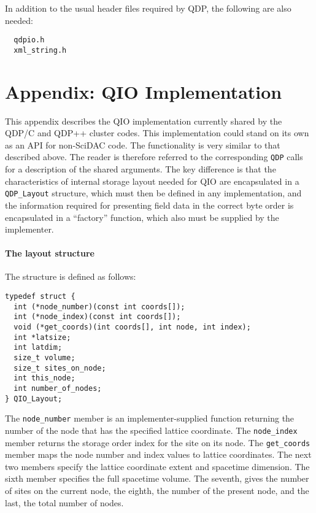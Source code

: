 \documentclass{article}
\begin{document}
In addition to the usual header files required by QDP, the following
are also needed:
%
\begin{verbatim}
  qdpio.h
  xml_string.h
\end{verbatim}
%

\section{Appendix: QIO Implementation}

This appendix describes the QIO implementation currently shared by the
QDP/C and QDP++ cluster codes.  This implementation could stand on its
own as an API for non-SciDAC code.  The functionality is very similar
to that described above.  The reader is therefore referred to the
corresponding \verb|QDP| calls for a description of the shared
arguments.  The key difference is that the characteristics of internal
storage layout needed for QIO are encapsulated in a \verb|QDP_Layout|
structure, which must then be defined in any implementation, and the
information required for presenting field data in the correct byte
order is encapsulated in a ``factory'' function, which also must be
supplied by the implementer.

\paragraph{The layout structure}

The structure is defined as follows:
\begin{verbatim}
typedef struct {
  int (*node_number)(const int coords[]);
  int (*node_index)(const int coords[]);
  void (*get_coords)(int coords[], int node, int index);
  int *latsize;
  int latdim;
  size_t volume;
  size_t sites_on_node;
  int this_node;
  int number_of_nodes;
} QIO_Layout;
\end{verbatim}
%
The \verb|node_number| member is an implementer-supplied function
returning the number of the node that has the specified lattice
coordinate.  The \verb|node_index| member returns the storage order
index for the site on its node.  The \verb|get_coords| member maps the
node number and index values to lattice coordinates. The next two
members specify the lattice coordinate extent and spacetime dimension.
The sixth member specifies the full spacetime volume.  The seventh,
gives the number of sites on the current node, the eighth, the number
of the present node, and the last, the total number of nodes.
\end{document}

